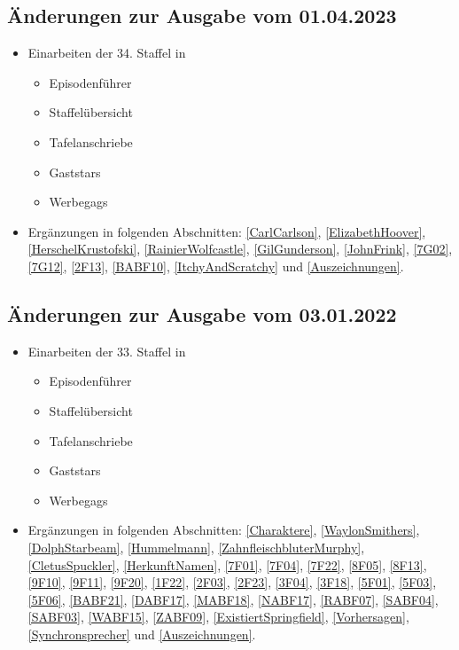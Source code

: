 \documentclass[pagesize,twoside,german]{scrbook}
\begin{document}
\subsection*{Änderungen zur Ausgabe vom 01.04.2023}
\begin{itemize}
	\item Einarbeiten der 34. Staffel in
	\begin{itemize}
		\item Episodenführer
		\item Staffelübersicht
		\item Tafelanschriebe
		\item Gaststars
		\item Werbegags
	\end{itemize}
	\item Ergänzungen in folgenden Abschnitten: \ref{CarlCarlson}, \ref{ElizabethHoover}, \ref{HerschelKrustofski}, \ref{RainierWolfcastle}, \ref{GilGunderson}, \ref{JohnFrink}, \ref{7G02}, \ref{7G12}, \ref{2F13}, \ref{BABF10}, \ref{ItchyAndScratchy} und \ref{Auszeichnungen}.
\end{itemize}

\subsection*{Änderungen zur Ausgabe vom 03.01.2022}
\begin{itemize}
	\item Einarbeiten der 33. Staffel in
	\begin{itemize}
		\item Episodenführer
		\item Staffelübersicht
		\item Tafelanschriebe
		\item Gaststars
		\item Werbegags
	\end{itemize}
	\item Ergänzungen in folgenden Abschnitten: \ref{Charaktere}, \ref{WaylonSmithers}, \ref{DolphStarbeam}, \ref{Hummelmann}, \ref{ZahnfleischbluterMurphy}, \ref{CletusSpuckler}, \ref{HerkunftNamen}, \ref{7F01}, \ref{7F04}, \ref{7F22}, \ref{8F05}, \ref{8F13}, \ref{9F10}, \ref{9F11}, \ref{9F20}, \ref{1F22}, \ref{2F03}, \ref{2F23}, \ref{3F04}, \ref{3F18}, \ref{5F01}, \ref{5F03}, \ref{5F06}, \ref{BABF21}, \ref{DABF17}, \ref{MABF18}, \ref{NABF17}, \ref{RABF07}, \ref{SABF04}, \ref{SABF03}, \ref{WABF15}, \ref{ZABF09}, \ref{ExistiertSpringfield}, \ref{Vorhersagen}, \ref{Synchronsprecher} und \ref{Auszeichnungen}.
\end{itemize}
\end{document}
